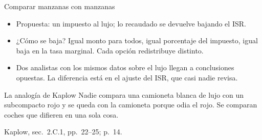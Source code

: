 \documentclass[aspectratio=169,11pt]{beamer}
\newcommand{\fuente}[1]{\par\vfill{\small\color{cGris}#1\par}}
\begin{document}
\begin{frame}{Comparar manzanas con manzanas}
  \begin{itemize}
    \item Propuesta: un impuesto al lujo; lo recaudado se devuelve bajando el ISR.
    \item ¿Cómo se baja? Igual monto para todos, igual porcentaje del impuesto, igual baja en la tasa marginal. Cada opción redistribuye distinto.
  \end{itemize}
  \pause
  \begin{itemize}
    \item Dos analistas con los mismos datos sobre el lujo llegan a conclusiones opuestas. La diferencia está en el ajuste del ISR, que casi nadie revisa.
  \end{itemize}
  \pause
  \begin{block}{La analogía de Kaplow}
    Nadie compara una camioneta blanca de lujo con un subcompacto rojo y se queda con la camioneta porque odia el rojo. Se comparan coches que difieren en una sola cosa.
  \end{block}
  \fuente{Kaplow, sec.~2.C.1, pp.~22--25; p.~14.}
\end{frame}
\end{document}
